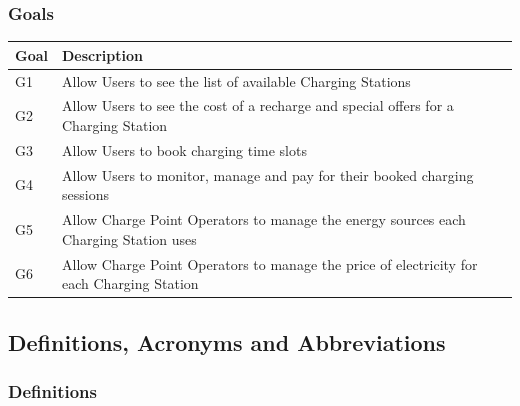 \documentclass[11pt]{article}
\begin{document}

\subsubsection{Goals}

\begin{table}[H]
    \centering
    \setlength{\tabcolsep}{18pt}
    \renewcommand{\arraystretch}{1.2}
    \begin{tabularx}{\textwidth}{|>{\centering\hsize=0.3\hsize}X|>{\hsize=1.7\hsize}X|}
        \hline
        \textbf{Goal} & \textbf{Description} \\
        \hline
        G1 & Allow Users to see the list of available Charging Stations \\
        \hline
        G2 & Allow Users to see the cost of a recharge and special offers for a Charging Station \\
        \hline
        G3 & Allow Users to book charging time slots \\
        \hline
        G4 & Allow Users to monitor, manage and pay for their booked charging sessions \\
        \hline
        G5 & Allow Charge Point Operators to manage the energy sources each Charging Station uses \\
        \hline
        G6 & Allow Charge Point Operators to manage the price of electricity for each Charging Station \\
        \hline
    \end{tabularx}
    \label{tab:goals}
\end{table}

\subsection{Definitions, Acronyms and Abbreviations}

\subsubsection{Definitions}
\end{document}
